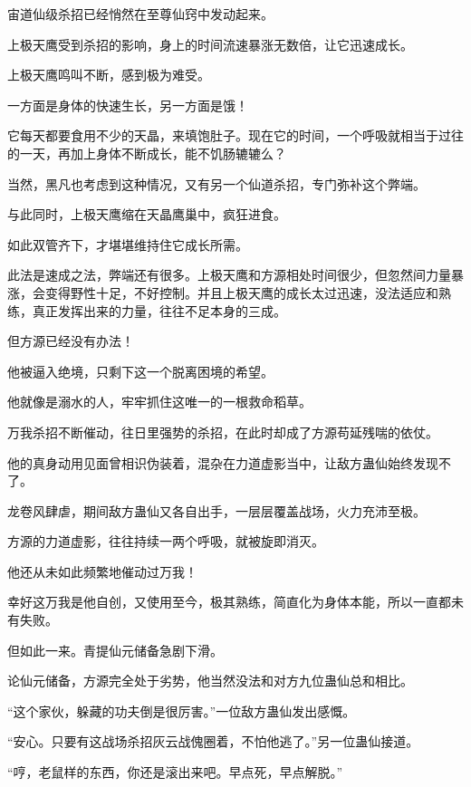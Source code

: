 
\begin{this_body}

宙道仙级杀招已经悄然在至尊仙窍中发动起来。

上极天鹰受到杀招的影响，身上的时间流速暴涨无数倍，让它迅速成长。

上极天鹰鸣叫不断，感到极为难受。

一方面是身体的快速生长，另一方面是饿！

它每天都要食用不少的天晶，来填饱肚子。现在它的时间，一个呼吸就相当于过往的一天，再加上身体不断成长，能不饥肠辘辘么？

当然，黑凡也考虑到这种情况，又有另一个仙道杀招，专门弥补这个弊端。

与此同时，上极天鹰缩在天晶鹰巢中，疯狂进食。

如此双管齐下，才堪堪维持住它成长所需。

此法是速成之法，弊端还有很多。上极天鹰和方源相处时间很少，但忽然间力量暴涨，会变得野性十足，不好控制。并且上极天鹰的成长太过迅速，没法适应和熟练，真正发挥出来的力量，往往不足本身的三成。

但方源已经没有办法！

他被逼入绝境，只剩下这一个脱离困境的希望。

他就像是溺水的人，牢牢抓住这唯一的一根救命稻草。

万我杀招不断催动，往日里强势的杀招，在此时却成了方源苟延残喘的依仗。

他的真身动用见面曾相识伪装着，混杂在力道虚影当中，让敌方蛊仙始终发现不了。

龙卷风肆虐，期间敌方蛊仙又各自出手，一层层覆盖战场，火力充沛至极。

方源的力道虚影，往往持续一两个呼吸，就被旋即消灭。

他还从未如此频繁地催动过万我！

幸好这万我是他自创，又使用至今，极其熟练，简直化为身体本能，所以一直都未有失败。

但如此一来。青提仙元储备急剧下滑。

论仙元储备，方源完全处于劣势，他当然没法和对方九位蛊仙总和相比。

“这个家伙，躲藏的功夫倒是很厉害。”一位敌方蛊仙发出感慨。

“安心。只要有这战场杀招灰云战傀圈着，不怕他逃了。”另一位蛊仙接道。

“哼，老鼠样的东西，你还是滚出来吧。早点死，早点解脱。”


\end{this_body}
